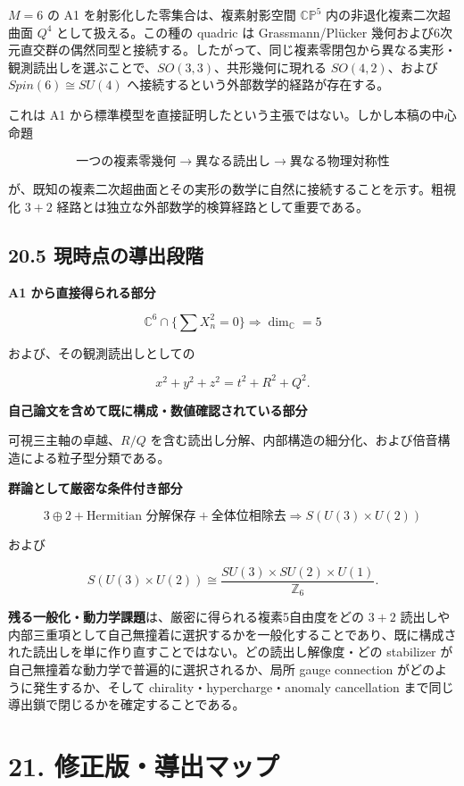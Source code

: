 \documentclass[
  a4paper,
]{ltjsarticle}
\begin{document}
\(M=6\) の A1 を射影化した零集合は、複素射影空間 \(\mathbb{CP}^5\)
内の非退化複素二次超曲面 \(Q^4\) として扱える。この種の quadric は
Grassmann/Plücker
幾何および6次元直交群の偶然同型と接続する。したがって、同じ複素零閉包から異なる実形・観測読出しを選ぶことで、\(SO(3,3)\)、共形幾何に現れる
\(SO(4,2)\)、および \(Spin(6)\cong SU(4)\)
へ接続するという外部数学的経路が存在する。

これは A1
から標準模型を直接証明したという主張ではない。しかし本稿の中心命題

\[
\boxed{\text{一つの複素零幾何}\longrightarrow\text{異なる読出し}\longrightarrow\text{異なる物理対称性}}
\]

が、既知の複素二次超曲面とその実形の数学に自然に接続することを示す。粗視化
\(3+2\) 経路とは独立な外部数学的検算経路として重要である。

\subsection{20.5
現時点の導出段階}\label{ux73feux6642ux70b9ux306eux5c0eux51faux6bb5ux968e}

\textbf{A1 から直接得られる部分}

\[
\boxed{\mathbb C^6\cap\{\sum X_n^2=0\}\Longrightarrow\dim_{\mathbb C}=5}
\]

および、その観測読出しとしての

\[
\boxed{x^2+y^2+z^2=t^2+R^2+Q^2}.
\]

\textbf{自己論文を含めて既に構成・数値確認されている部分}

可視三主軸の卓越、\(R/Q\)
を含む読出し分解、内部構造の細分化、および倍音構造による粒子型分類である。

\textbf{群論として厳密な条件付き部分}

\[
3\oplus2+\text{Hermitian 分解保存}+\text{全体位相除去}
\Longrightarrow
S(U(3)\times U(2))
\]

および

\[
S(U(3)\times U(2))
\cong
\frac{SU(3)\times SU(2)\times U(1)}{\mathbb Z_6}.
\]

\textbf{残る一般化・動力学課題}は、厳密に得られる複素5自由度をどの
\(3+2\)
読出しや内部三重項として自己無撞着に選択するかを一般化することであり、既に構成された読出しを単に作り直すことではない。どの読出し解像度・どの
stabilizer が自己無撞着な動力学で普遍的に選択されるか、局所 gauge
connection がどのように発生するか、そして
chirality・hypercharge・anomaly cancellation
まで同じ導出鎖で閉じるかを確定することである。

\section{21.
修正版・導出マップ}\label{ux4feeux6b63ux7248ux5c0eux51faux30deux30c3ux30d7}
\end{document}
